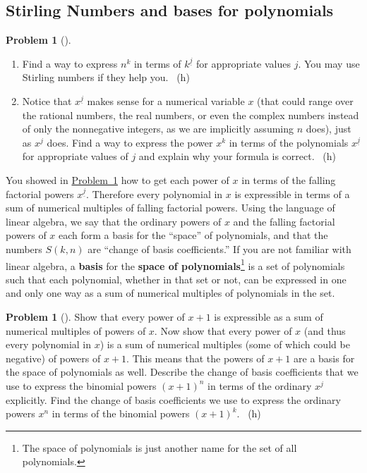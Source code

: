 \documentclass[10pt,]{book}
\newcommand{\terminology}[1]{\textbf{#1}}
\theoremstyle{plain}
\theoremstyle{definition}
\newtheorem{activity}[project]{Problem}
\theoremstyle{definition}
\numberwithin{equation}{chapter}
\begin{document}
\subsection[{Stirling Numbers and bases for polynomials}]{Stirling Numbers and bases for polynomials}\label{subsection-35}
\begin{activity}[] \label{powersfromfalling}
\leavevmode%
\begin{enumerate}[font=\bfseries,label=(\alph*),ref=\alph*]
\item\label{task-111} \marginsymbol[-2.5em]{} \hypertarget{p-854}{}%
Find a way to express \(n^k\) in terms of \(k^{\underline{j}}\) for appropriate values \(j\). You may use Stirling numbers if they help you.%
~{\tiny (h)}\item\label{task-112} \marginsymbol[-2.5em]{} \hypertarget{p-857}{}%
Notice that \(x^{\underline{j}}\) makes sense for a numerical variable \(x\) (that could range over the rational numbers, the real numbers, or even the complex numbers instead of only the nonnegative integers, as we are implicitly assuming \(n\) does), just as \(x^j\) does. Find a way to express the power \(x^k\) in terms of the polynomials \(x^{\underline{j}}\) for appropriate values of \(j\) and explain why your formula is correct.%
~{\tiny (h)}\end{enumerate}
\end{activity}
\hypertarget{p-861}{}%
You showed in \hyperref[powersfromfalling]{Problem~\ref{powersfromfalling}} how to get each power of \(x\) in terms of the falling factorial powers \(x^{\underline{j}}\). Therefore every polynomial in \(x\) is expressible in terms of a sum of numerical multiples of falling factorial powers. Using the language of linear algebra, we say that the ordinary powers of \(x\) and the falling factorial powers of \(x\) each form a basis for the ``space'' of polynomials, and that the numbers \(S(k,n)\) are ``change of basis coefficients.'' If you are not familiar with linear algebra, a \terminology{basis} for the \terminology{space of polynomials}\footnote{The space of polynomials is just another name for the set of all polynomials.\label{fn-8}} is a set of polynomials such that each polynomial, whether in that set or not, can be expressed in one and only one way as a sum of numerical multiples of polynomials in the set.%
\begin{activity}[] \label{activity-153}
\hypertarget{p-862}{}%
Show that every power of \(x+1\) is expressible as a sum of numerical multiples of powers of \(x\). Now show that every power of \(x\) (and thus every polynomial in \(x\)) is a sum of numerical multiples (some of which could be negative) of powers of \(x+1\). This means that the powers of \(x+1\) are a basis for the space of polynomials as well. Describe the change of basis coefficients that we use to express the binomial powers \((x+1)^n\) in terms of the ordinary \(x^j\) explicitly. Find the change of basis coefficients we use to express the ordinary powers \(x^n\) in terms of the binomial powers \((x+1)^k\).%
~{\tiny (h)}\end{activity}
\end{document}
